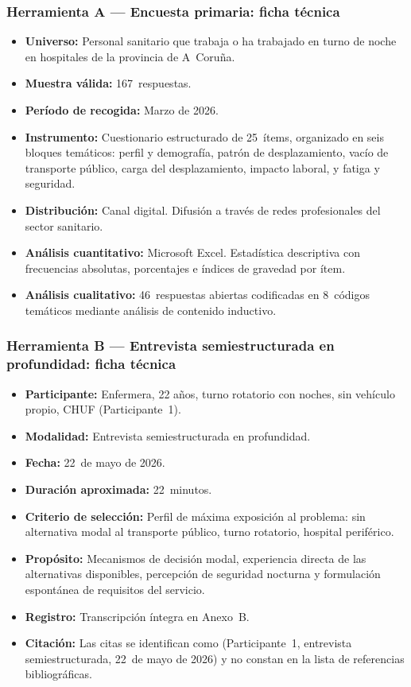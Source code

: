 \subsubsection{Herramienta A --- Encuesta primaria: ficha técnica}
\label{sec:ficha-tecnica-encuesta}

\begin{itemize}
  \item \textbf{Universo:} Personal sanitario que trabaja o ha trabajado en turno de noche en hospitales de la provincia de A~Coruña.
  \item \textbf{Muestra válida:} 167~respuestas.
  \item \textbf{Período de recogida:} Marzo de 2026.
  \item \textbf{Instrumento:} Cuestionario estructurado de 25~ítems, organizado en seis bloques temáticos: perfil y demografía, patrón de desplazamiento, vacío de transporte público, carga del desplazamiento, impacto laboral, y fatiga y seguridad.
  \item \textbf{Distribución:} Canal digital. Difusión a través de redes profesionales del sector sanitario.
  \item \textbf{Análisis cuantitativo:} Microsoft Excel. Estadística descriptiva con frecuencias absolutas, porcentajes e índices de gravedad por ítem.
  \item \textbf{Análisis cualitativo:} 46~respuestas abiertas codificadas en 8~códigos temáticos mediante análisis de contenido inductivo.
\end{itemize}

\subsubsection{Herramienta B --- Entrevista semiestructurada en profundidad: ficha técnica}
\label{sec:ficha-tecnica-entrevista}

\begin{itemize}
  \item \textbf{Participante:} Enfermera, 22 años, turno rotatorio con noches, sin vehículo propio, \acs{CHUF} (Participante~1).
  \item \textbf{Modalidad:} Entrevista semiestructurada en profundidad.
  \item \textbf{Fecha:} 22~de mayo de 2026.
  \item \textbf{Duración aproximada:} 22~minutos.
  \item \textbf{Criterio de selección:} Perfil de máxima exposición al problema: sin alternativa modal al transporte público, turno rotatorio, hospital periférico.
  \item \textbf{Propósito:} Mecanismos de decisión modal, experiencia directa de las alternativas disponibles, percepción de seguridad nocturna y formulación espontánea de requisitos del servicio.
  \item \textbf{Registro:} Transcripción íntegra en Anexo~B.
  \item \textbf{Citación:} Las citas se identifican como (Participante~1, entrevista semiestructurada, 22~de mayo de 2026) y no constan en la lista de referencias bibliográficas.
\end{itemize}

